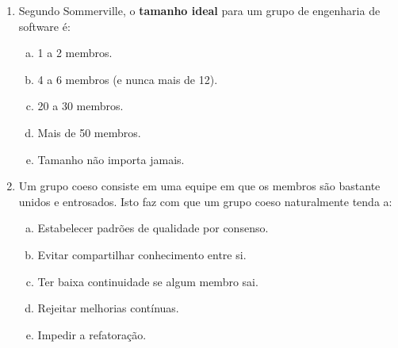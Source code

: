\documentclass{beamer}
\begin{document}
\begin{frame}
    \begin{enumerate}
        \justifying
        \setcounter{enumi}{6}
        \item<1-2> Segundo Sommerville, o \textbf{tamanho ideal} para um grupo de engenharia de software é:
        \begin{enumerate}[a)]
            \justifying
            \item<1-2> 1 a 2 membros.
            \item<1-2> \alert<2>{4 a 6 membros (e nunca mais de 12)}.
            \item<1-2> 20 a 30 membros.
            \item<1-2> Mais de 50 membros.
            \item<1-2> Tamanho não importa jamais.
        \end{enumerate}
        \item<3-4> Um grupo coeso consiste em uma equipe em que os membros são bastante unidos e entrosados. Isto faz com que um grupo coeso naturalmente tenda a:
        \begin{enumerate}[a)]
            \justifying
            \item<3-4> \alert<4>{Estabelecer padrões de qualidade por consenso}.
            \item<3-4> Evitar compartilhar conhecimento entre si.
            \item<3-4> Ter baixa continuidade se algum membro sai.
            \item<3-4> Rejeitar melhorias contínuas.
            \item<3-4> Impedir a refatoração.
        \end{enumerate}
    \end{enumerate}
\end{frame}
\end{document}
